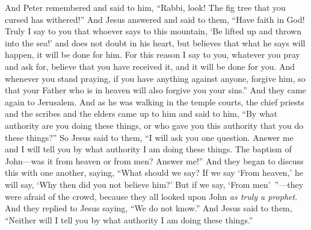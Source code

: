 \begin{biblechapter}
\verse And Peter remembered and said to him, “Rabbi, look! The fig tree that you cursed has withered!”
\verse And Jesus answered and said to them, “Have faith in God!
\verse Truly I say to you that whoever says to this mountain, ‘Be lifted up and thrown into the sea!’ and does not doubt in his heart, but believes that what he says will happen, it will be done for him.
\verse For this reason I say to you, whatever you pray and ask for, believe that you have received it, and it will be done for you.
\verse And whenever you stand praying, if you have anything against anyone, forgive him, so that your Father who is in heaven will also forgive you your sins.”
 And they came again to Jerusalem. And as he was walking in the temple courts, the chief priests and the scribes and the elders came up to him
\verse and said to him, “By what authority are you doing these things, or who gave you this authority that you do these things?”
\verse So Jesus said to them, “I will ask you one question. Answer me and I will tell you by what authority I am doing these things.
\verse The baptism of John—was it from heaven or from men? Answer me!”
\verse And they began to discuss this with one another, saying, “What should we say? If we say ‘From heaven,’ he will say, ‘Why then did you not believe him?’
\verse But if we say, ‘From men’ ”—they were afraid of the crowd, because they all looked upon John \textit{as truly a prophet}.
\verse And they replied to Jesus saying, “We do not know.” And Jesus said to them, “Neither will I tell you by what authority I am doing these things.”
\end{biblechapter}

